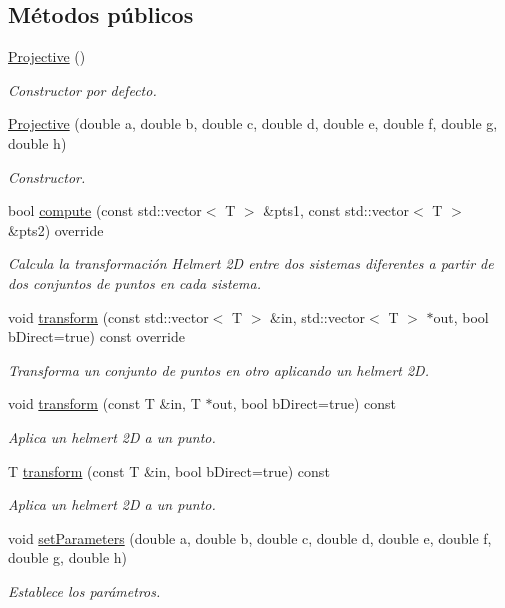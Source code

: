 \subsection*{Métodos públicos}
\begin{DoxyCompactItemize}
\item 
\hyperlink{class_i3_d_1_1_projective_a0557393a26c7c3324be20d7c481ca323}{Projective} ()
\begin{DoxyCompactList}\small\item\em Constructor por defecto. \end{DoxyCompactList}\item 
\hyperlink{class_i3_d_1_1_projective_ae355c6c6aa3825bc3e808a25166724c3}{Projective} (double a, double b, double c, double d, double e, double f, double g, double h)
\begin{DoxyCompactList}\small\item\em Constructor. \end{DoxyCompactList}\item 
bool \hyperlink{group__trf2_d_group_gaae888e9e90db1050898b63386252fc88}{compute} (const std\+::vector$<$ T $>$ \&pts1, const std\+::vector$<$ T $>$ \&pts2) override
\begin{DoxyCompactList}\small\item\em Calcula la transformación Helmert 2D entre dos sistemas diferentes a partir de dos conjuntos de puntos en cada sistema. \end{DoxyCompactList}\item 
void \hyperlink{group__trf2_d_group_ga9339dfc7f978fa6bbb9e2233930e8a3c}{transform} (const std\+::vector$<$ T $>$ \&in, std\+::vector$<$ T $>$ $\ast$out, bool b\+Direct=true) const  override
\begin{DoxyCompactList}\small\item\em Transforma un conjunto de puntos en otro aplicando un helmert 2D. \end{DoxyCompactList}\item 
void \hyperlink{group__trf2_d_group_ga1ecc0ebf8cc05c94bd9d9033416ac358}{transform} (const T \&in, T $\ast$out, bool b\+Direct=true) const 
\begin{DoxyCompactList}\small\item\em Aplica un helmert 2D a un punto. \end{DoxyCompactList}\item 
T \hyperlink{group__trf2_d_group_gaf5ad47e08dc23464413870c2b7da4fc0}{transform} (const T \&in, bool b\+Direct=true) const 
\begin{DoxyCompactList}\small\item\em Aplica un helmert 2D a un punto. \end{DoxyCompactList}\item 
void \hyperlink{group__trf2_d_group_gaf03861962a0be948aaa7e032b9e1729b}{set\+Parameters} (double a, double b, double c, double d, double e, double f, double g, double h)
\begin{DoxyCompactList}\small\item\em Establece los parámetros. \end{DoxyCompactList}\end{DoxyCompactItemize}
